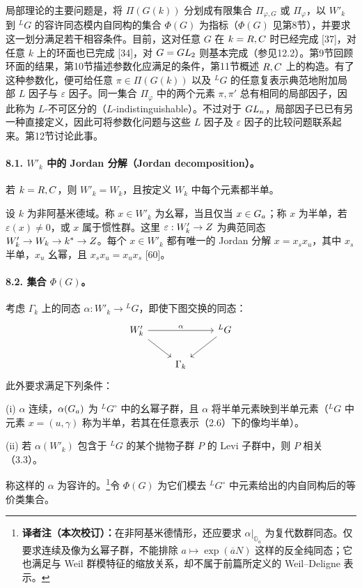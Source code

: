 局部理论的主要问题是，将 $\Pi(G(k))$ 分划成有限集合 $\Pi_{\varphi,G}$ 或 $\Pi_\varphi$，以 $W'_k$ 到 ${}^LG$ 的容许同态模内自同构的集合 $\Phi(G)$ 为指标（$\Phi(G)$ 见第8节），并要求这一划分满足若干相容条件。目前，这对任意 $G$ 在 $k=R,C$ 时已经完成 [37]，对任意 $k$ 上的环面也已完成 [34]，对 $G=GL_2$ 则基本完成（参见12.2）。第9节回顾环面的结果，第10节描述参数化应满足的条件，第11节概述 $R,C$ 上的构造。有了这种参数化，便可给任意 $\pi\in\Pi(G(k))$ 以及 ${}^LG$ 的任意复表示典范地附加局部 $L$ 因子与 $\varepsilon$ 因子。同一集合 $\Pi_\varphi$ 中的两个元素 $\pi,\pi'$ 总有相同的局部因子，因此称为 $L$-不可区分的（$L$-indistinguishable）。不过对于 $GL_n$，局部因子已已有另一种直接定义，因此可将参数化问题与这些 $L$ 因子及 $\varepsilon$ 因子的比较问题联系起来。第12节讨论此事。

\paragraph*{8.1. $W'_k$ 中的 Jordan 分解（Jordan decomposition）。}
若 $k=R,C$，则 $W'_k=W_k$，且按定义 $W_k$ 中每个元素都半单。

设 $k$ 为非阿基米德域。称 $x\in W'_k$ 为幺幂，当且仅当 $x\in G_{a}$；称 $x$ 为半单，若 $\varepsilon(x)\neq0$，或 $x$ 属于惯性群。这里 $\varepsilon:W'_k\to Z$ 为典范同态 $W'_k\to W_k\to k^*\to Z$。每个 $x\in W'_k$ 都有唯一的 Jordan 分解 $x=x_sx_u$，其中 $x_s$ 半单，$x_u$ 幺幂，且 $x_sx_u=x_ux_s$ [60]。

\paragraph*{8.2. 集合 $\Phi(G)$。}
考虑 $\Gamma_k$ 上的同态 $\alpha:W'_k\to{}^LG$，即使下图交换的同态：
\[
\begin{tikzcd}
 W'_k\arrow[rr,"\alpha"]\arrow[dr]&&{}^LG\arrow[dl]\\
 &\Gamma_k&
\end{tikzcd}
\]
此外要求满足下列条件：

(i) $\alpha$ 连续，$\alpha(G_{a})$ 为 ${}^LG^\circ$ 中的幺幂子群，且 $\alpha$ 将半单元素映到半单元素（${}^LG$ 中元素 $x=(u,\gamma)$ 称为半单，若其在任意表示（2.6）下的像均半单）。

(ii) 若 $\alpha(W'_k)$ 包含于 ${}^LG$ 的某个抛物子群 $P$ 的 Levi 子群中，则 $P$ 相关（3.3）。

称这样的 $\alpha$ 为容许的。\footnote{\textbf{译者注（本次校订）：}在非阿基米德情形，还应要求 $\alpha|_{\mathbb G_a}$ 为复代数群同态。仅要求连续及像为幺幂子群，不能排除 $a\mapsto\exp(\overline aN)$ 这样的反全纯同态；它也满足与 Weil 群模特征的缩放关系，却不属于前篇所定义的 Weil--Deligne 表示。}令 $\Phi(G)$ 为它们模去 ${}^LG^\circ$ 中元素给出的内自同构后的等价类集合。


